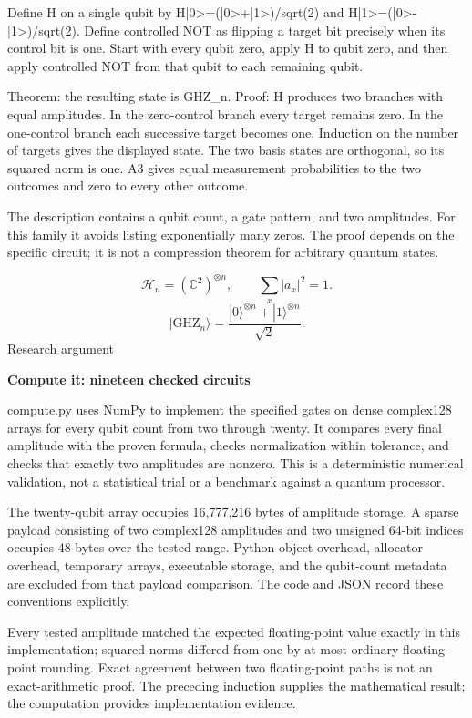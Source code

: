 \documentclass[10pt]{article}
\begin{document}
Define H on a single qubit by H|0>=(|0>+|1>)/sqrt(2) and H|1>=(|0>-|1>)/sqrt(2). Define controlled NOT as flipping a target bit precisely when its control bit is one. Start with every qubit zero, apply H to qubit zero, and then apply controlled NOT from that qubit to each remaining qubit.\par
Theorem: the resulting state is GHZ\_n. Proof: H produces two branches with equal amplitudes. In the zero-control branch every target remains zero. In the one-control branch each successive target becomes one. Induction on the number of targets gives the displayed state. The two basis states are orthogonal, so its squared norm is one. A3 gives equal measurement probabilities to the two outcomes and zero to every other outcome.\par
The description contains a qubit count, a gate pattern, and two amplitudes. For this family it avoids listing exponentially many zeros. The proof depends on the specific circuit; it is not a compression theorem for arbitrary quantum states.\par
\[\mathcal H_n=(\mathbb C^2)^{\otimes n},\qquad\sum_x |a_x|^2=1.\]
\[|\mathrm{GHZ}_n\rangle=\frac{|0\rangle^{\otimes n}+|1\rangle^{\otimes n}}{\sqrt2}.\]
\clearpage
{\small\color{accent}Research argument}\par
{\LARGE\bfseries\color{ink}Compute it: nineteen checked circuits}\par\vspace{7pt}
compute.py uses NumPy to implement the specified gates on dense complex128 arrays for every qubit count from two through twenty. It compares every final amplitude with the proven formula, checks normalization within tolerance, and checks that exactly two amplitudes are nonzero. This is a deterministic numerical validation, not a statistical trial or a benchmark against a quantum processor.\par
The twenty-qubit array occupies 16,777,216 bytes of amplitude storage. A sparse payload consisting of two complex128 amplitudes and two unsigned 64-bit indices occupies 48 bytes over the tested range. Python object overhead, allocator overhead, temporary arrays, executable storage, and the qubit-count metadata are excluded from that payload comparison. The code and JSON record these conventions explicitly.\par
Every tested amplitude matched the expected floating-point value exactly in this implementation; squared norms differed from one by at most ordinary floating-point rounding. Exact agreement between two floating-point paths is not an exact-arithmetic proof. The preceding induction supplies the mathematical result; the computation provides implementation evidence.\par
\end{document}
